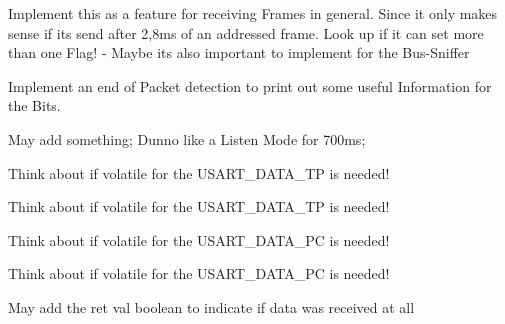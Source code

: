 
\begin{DoxyRefList}
\item[\label{todo__todo000004}%
\hypertarget{todo__todo000004}{}%
Global \hyperlink{shell_8h_a7b264b3bfe53d649c5b7653cfd97033d}{ack\+Info} (void)]Implement this as a feature for receiving Frames in general. Since it only makes sense if its send after 2,8ms of an addressed frame. Look up if it can set more than one Flag! -\/ Maybe its also important to implement for the Bus-\/\+Sniffer 
\item[\label{todo__todo000002}%
\hypertarget{todo__todo000002}{}%
Global \hyperlink{shell_8h_ad95c9c45c97cc744ca49a98494bf9465}{act\+\_\+busmon} (void)]Implement an end of Packet detection to print out some useful Information for the Bits.  
\item[\label{todo__todo000003}%
\hypertarget{todo__todo000003}{}%
Global \hyperlink{shell_8h_a5c364cd022ec191bccd57afa8aae1e89}{act\+\_\+busymode} (void)]May add something; Dunno like a Listen Mode for 700ms;  
\item[\label{todo__todo000010}%
\hypertarget{todo__todo000010}{}%
Global \hyperlink{_u_a_r_t_8c_aace195abde7bc36b7b50772ff2277dd4}{I\+SR} (U\+S\+A\+R\+T\+C0\+\_\+\+R\+X\+C\+\_\+vect)]Think about if volatile for the U\+S\+A\+R\+T\+\_\+\+D\+A\+T\+A\+\_\+\+TP is needed! 
\item[\label{todo__todo000011}%
\hypertarget{todo__todo000011}{}%
Global \hyperlink{_u_a_r_t_8c_abbfd0611f43db59ea4fdb1ea434cf017}{I\+SR} (U\+S\+A\+R\+T\+C0\+\_\+\+D\+R\+E\+\_\+vect)]Think about if volatile for the U\+S\+A\+R\+T\+\_\+\+D\+A\+T\+A\+\_\+\+TP is needed! 
\item[\label{todo__todo000013}%
\hypertarget{todo__todo000013}{}%
Global \hyperlink{_u_a_r_t_8c_acdf978f69a52b8a2225b0536b5fbff0e}{I\+SR} (U\+S\+A\+R\+T\+C1\+\_\+\+D\+R\+E\+\_\+vect)]Think about if volatile for the U\+S\+A\+R\+T\+\_\+\+D\+A\+T\+A\+\_\+\+PC is needed! 
\item[\label{todo__todo000012}%
\hypertarget{todo__todo000012}{}%
Global \hyperlink{_u_a_r_t_8c_a6c9949e5146d1feb028b0c2db8754523}{I\+SR} (U\+S\+A\+R\+T\+C1\+\_\+\+R\+X\+C\+\_\+vect)]Think about if volatile for the U\+S\+A\+R\+T\+\_\+\+D\+A\+T\+A\+\_\+\+PC is needed!  
\item[\label{todo__todo000009}%
\hypertarget{todo__todo000009}{}%
Global \hyperlink{_u_a_r_t_8h_a6a0a1c62a63f3388c9d22c87a069ebe7}{receive\+\_\+string\+\_\+from\+\_\+usart} (U\+S\+A\+R\+T\+\_\+data\+\_\+t $\ast$\+U\+S\+A\+R\+T\+\_\+data, char $\ast$string)]May add the ret val boolean to indicate if data was received at all 

\end{DoxyRefList}
